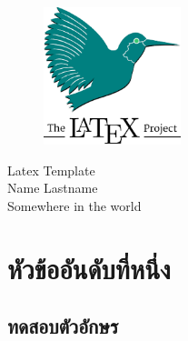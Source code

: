 \documentclass[14pt,a4paper]{extarticle}
\begin{document}
\begin{titlepage}
  \begin{figure}
    \centering
    \includegraphics[width=4cm]{latex.png}
  \end{figure}
  \begin{center}
    \Huge Latex Template \\
    \vspace{5cm} 
    \LARGE Name Lastname \\
    \vfill
    \LARGE Somewhere in the world
    \pagebreak
  \end{center}
\end{titlepage}
\newpage
\section{หัวข้ออันดับที่หนึ่ง}
\subsection{ทดสอบตัวอักษร}
\lipsum[1] %
\end{document}
